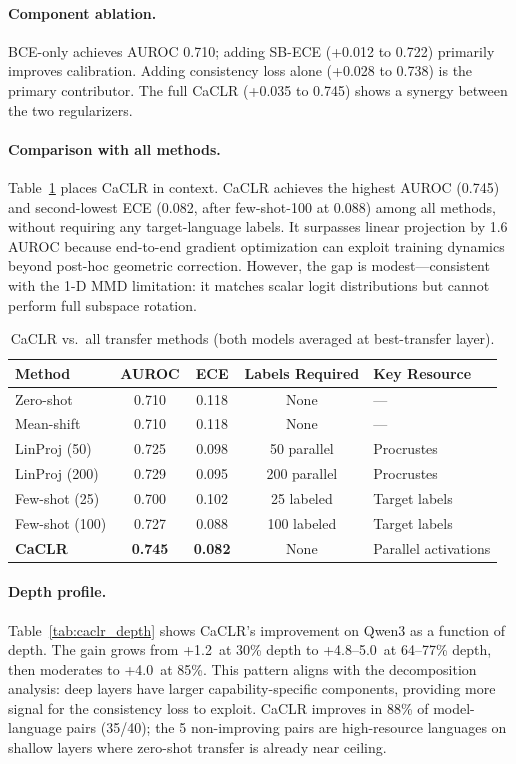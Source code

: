 \documentclass[11pt,a4paper]{article}
\newcommand{\pp}{\,\text{pp}}
\begin{document}
\paragraph{Component ablation.}
BCE-only achieves AUROC 0.710; adding SB-ECE (+0.012 to 0.722) primarily improves calibration. Adding consistency loss alone (+0.028 to 0.738) is the primary contributor. The full CaCLR (+0.035 to 0.745) shows a synergy between the two regularizers.

\paragraph{Comparison with all methods.}
Table~\ref{tab:caclr_compare} places CaCLR in context. CaCLR achieves the highest AUROC (0.745) and second-lowest ECE (0.082, after few-shot-100 at 0.088) among all methods, without requiring any target-language labels. It surpasses linear projection by 1.6\pp{} AUROC because end-to-end gradient optimization can exploit training dynamics beyond post-hoc geometric correction. However, the gap is modest---consistent with the 1-D MMD limitation: it matches scalar logit distributions but cannot perform full subspace rotation.

\begin{table}[t]
\centering
\caption{CaCLR vs.\ all transfer methods (both models averaged at best-transfer layer).}
\label{tab:caclr_compare}
\small
\begin{tabular}{lcccl}
\toprule
Method & AUROC & ECE & Labels Required & Key Resource \\
\midrule
Zero-shot       & 0.710 & 0.118 & None & --- \\
Mean-shift      & 0.710 & 0.118 & None & --- \\
LinProj (50)    & 0.725 & 0.098 & 50 parallel & Procrustes \\
LinProj (200)   & 0.729 & 0.095 & 200 parallel & Procrustes \\
Few-shot (25)   & 0.700 & 0.102 & 25 labeled & Target labels \\
Few-shot (100)  & 0.727 & 0.088 & 100 labeled & Target labels \\
\textbf{CaCLR}  & \textbf{0.745} & \textbf{0.082} & None & Parallel activations \\
\bottomrule
\end{tabular}
\end{table}

\paragraph{Depth profile.}
Table~\ref{tab:caclr_depth} shows CaCLR's improvement on Qwen3 as a function of depth. The gain grows from +1.2\pp{} at 30\% depth to +4.8--5.0\pp{} at 64--77\% depth, then moderates to +4.0\pp{} at 85\%. This pattern aligns with the decomposition analysis: deep layers have larger capability-specific components, providing more signal for the consistency loss to exploit. CaCLR improves in 88\% of model-language pairs (35/40); the 5 non-improving pairs are high-resource languages on shallow layers where zero-shot transfer is already near ceiling.
\end{document}
